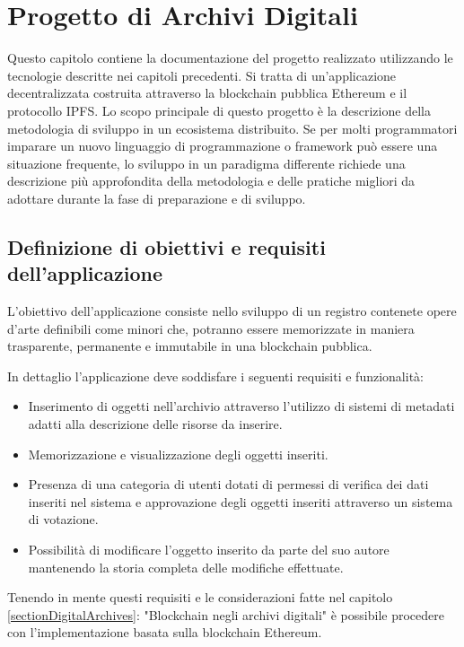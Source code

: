 \chapter{Progetto di Archivi Digitali}
\label{ch:archivi}

Questo capitolo contiene la documentazione del progetto realizzato utilizzando le tecnologie descritte nei capitoli precedenti. Si tratta di un’applicazione decentralizzata costruita attraverso la blockchain pubblica Ethereum e il protocollo IPFS. Lo scopo principale di questo progetto è la descrizione della metodologia di sviluppo in un ecosistema distribuito. Se per molti programmatori imparare un nuovo linguaggio di programmazione o framework può essere una situazione frequente, lo sviluppo in un paradigma differente richiede una descrizione più approfondita della metodologia e delle pratiche migliori da adottare durante la fase di preparazione e di sviluppo.

\section{Definizione di obiettivi e requisiti dell’applicazione}

L’obiettivo dell'applicazione consiste nello sviluppo di un registro contenete opere d’arte definibili come minori che, potranno essere memorizzate in maniera trasparente, permanente e immutabile in una blockchain pubblica.

In dettaglio l’applicazione deve soddisfare i seguenti requisiti e funzionalità:

\begin{itemize}
\item Inserimento di oggetti nell’archivio attraverso l’utilizzo di sistemi di metadati adatti alla descrizione delle risorse da inserire.
\item Memorizzazione e visualizzazione degli oggetti inseriti.
\item Presenza di una categoria di utenti dotati di permessi di verifica dei dati inseriti nel sistema e approvazione degli oggetti inseriti attraverso un sistema di votazione.
\item Possibilità di modificare l’oggetto inserito da parte del suo autore mantenendo la storia completa delle modifiche effettuate.
\end{itemize}

Tenendo in mente questi requisiti e le considerazioni fatte nel capitolo \ref{sectionDigitalArchives}: "Blockchain negli archivi digitali" è possibile procedere con l'implementazione basata sulla blockchain Ethereum.


